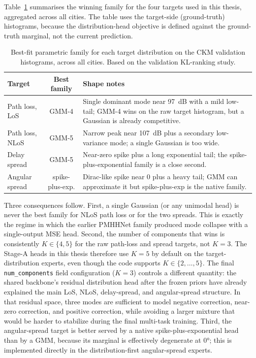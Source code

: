 Table~\ref{tab:gmm_k_choice} summarises the winning family for the four
targets used in this thesis, aggregated across all cities. The table uses the
target-side (ground-truth) histograms, because the distribution-head objective
is defined against the ground-truth marginal, not the current prediction.

\begin{table}[H]
\centering
\caption[Best-fit parametric family by target.]%
{Best-fit parametric family for each target distribution on the CKM
validation histograms, across all cities. Based on the validation
KL-ranking study.}
\label{tab:gmm_k_choice}
\begin{tabularx}{\textwidth}{lcX}
\toprule
Target & Best family & Shape notes \\
\midrule
Path loss, LoS   & GMM-4 & Single dominant mode near \SI{97}{dB} with a mild
                              low-tail; GMM-4 wins on the raw target
                              histogram, but a Gaussian is already
                              competitive. \\
Path loss, NLoS  & GMM-5 & Narrow peak near \SI{107}{dB} plus a secondary
                              low-variance mode; a single Gaussian is too
                              wide. \\
Delay spread     & GMM-5 & Near-zero spike plus a long exponential tail;
                              the spike-plus-exponential family is a close
                              second. \\
Angular spread   & spike-plus-exp. & Dirac-like spike near 0\textdegree{} plus
                              a heavy tail; GMM can approximate it but
                              spike-plus-exp is the native family. \\
\bottomrule
\end{tabularx}
\end{table}

Three consequences follow. First, a single Gaussian (or any unimodal head) is
never the best family for NLoS path loss or for the two spreads. This is
exactly the regime in which the earlier PMHHNet family produced mode collapse
with a single-output MSE head. Second, the number of components that wins is
consistently $K\in\{4, 5\}$ for the raw path-loss and spread targets, not
$K=3$. The Stage-A heads in this thesis therefore use $K=5$ by default on
the target-distribution experts, even though the code supports
$K\in\{2,\dots,5\}$. The final \texttt{num\_components} field
configuration (\(K=3\)) controls a different quantity: the shared backbone's
residual distribution head after the frozen priors have already
explained the main LoS, NLoS, delay-spread, and angular-spread structure. In
that residual space, three modes are sufficient to model negative correction,
near-zero correction, and positive correction, while avoiding a larger mixture
that would be harder to stabilize during the final multi-task training. Third, the
angular-spread target is better served by a native spike-plus-exponential
head than by a GMM, because its marginal is effectively degenerate at
\ang{0}; this is implemented directly in the distribution-first angular-spread
experts.

